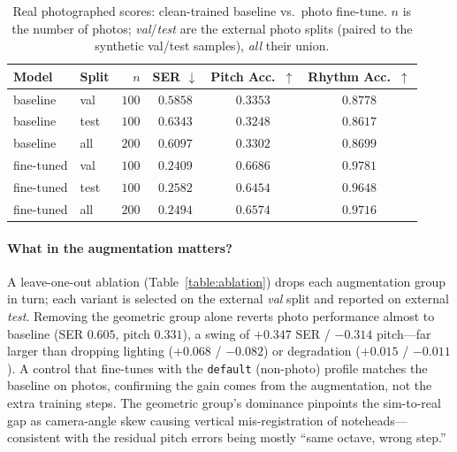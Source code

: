 \begin{table}[htbp]
\centering
\caption{Real photographed scores: clean-trained baseline vs.\ photo fine-tune.
$n$ is the number of photos; \emph{val}/\emph{test} are the external photo splits
(paired to the synthetic val/test samples), \emph{all} their union.}
\label{table:external}
\begin{tabular}{llrccc}
\toprule
\textbf{Model} & \textbf{Split} & \textbf{$n$} & \textbf{SER $\downarrow$} & \textbf{Pitch Acc.\ $\uparrow$} & \textbf{Rhythm Acc.\ $\uparrow$} \\
\midrule
baseline   & val  & $100$ & $0.5858$ & $0.3353$ & $0.8778$ \\
baseline   & test & $100$ & $0.6343$ & $0.3248$ & $0.8617$ \\
baseline   & all  & $200$ & $0.6097$ & $0.3302$ & $0.8699$ \\
\midrule
fine-tuned & val  & $100$ & $0.2409$ & $0.6686$ & $0.9781$ \\
fine-tuned & test & $100$ & $\mathbf{0.2582}$ & $\mathbf{0.6454}$ & $\mathbf{0.9648}$ \\
fine-tuned & all  & $200$ & $0.2494$ & $0.6574$ & $0.9716$ \\
\bottomrule
\end{tabular}
\end{table}

\paragraph{What in the augmentation matters?} A leave-one-out ablation
(Table~\ref{table:ablation}) drops each augmentation group in turn; each variant
is selected on the external \emph{val} split and reported on external \emph{test}.
Removing the geometric group alone reverts photo performance almost to baseline
(SER $0.605$, pitch $0.331$), a swing of $+0.347$ SER / $-0.314$ pitch---far
larger than dropping lighting ($+0.068$ / $-0.082$) or degradation ($+0.015$ /
$-0.011$). A control that fine-tunes with the \texttt{default} (non-photo) profile
matches the baseline on photos, confirming the gain comes from the augmentation,
not the extra training steps. The geometric group's dominance pinpoints the
sim-to-real gap as camera-angle skew causing vertical mis-registration of
noteheads---consistent with the residual pitch errors being mostly
``same octave, wrong step.''

